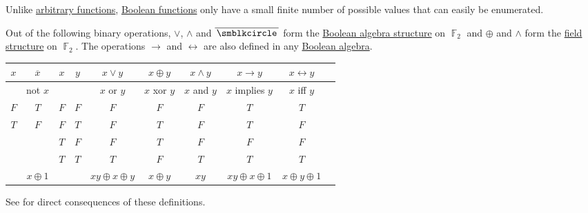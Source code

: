 \begin{definition}\label{def:standard_boolean_operators}
  Unlike \hyperref[def:function/single_valued]{arbitrary functions}, \hyperref[def:boolean_function]{Boolean functions} only have a small finite number of possible values that can easily be enumerated.

  Out of the following binary operations, \( \vee \), \( \wedge \) and \( \overline{\placeholder} \) form the \hyperref[thm:f2_is_boolean_algebra]{Boolean algebra structure} on \( \BbbF_2 \) and \( \oplus \) and \( \wedge \) form the \hyperref[def:field]{field structure} on \( \BbbF_2 \). The operations \( \rightarrow \) and \( \leftrightarrow \) are also defined in any \hyperref[def:boolean_algebra]{Boolean algebra}.

  \begin{center}
    \begin{tabular}{c | c || c c | c c c c c c}
      \( x \) & \( \overline{x} \) & \( x \) & \( y \) & \( x \vee y \) & \( x \oplus y \)    & \( x \wedge y \) & \( x \rightarrow y \)   & \( x \leftrightarrow y \) \\
      \hline
              & not \( x \)        &         &         & \( x \) or \( y \)  & \( x \) xor \( y \) & \( x \) and \( y \)     & \( x \) implies \( y \) & \( x \) iff \( y \)       \\
      \hline
      \( F \) & \( T \)            & \( F \) & \( F \) & \( F \)             & \( F \)             & \( F \)                 & \( T \)                 & \( T \)                   \\
      \( T \) & \( F \)            & \( F \) & \( T \) & \( F \)             & \( T \)             & \( F \)                 & \( T \)                 & \( F \)                   \\
              &                    & \( T \) & \( F \) & \( F \)             & \( T \)             & \( F \)                 & \( F \)                 & \( F \)                   \\
              &                    & \( T \) & \( T \) & \( T \)             & \( F \)             & \( T \)                 & \( T \)                 & \( T \)                   \\
      \hline
              & \( x \oplus 1 \) &         &         & \( xy \oplus x \oplus y \) & \( x \oplus y \)    & \( xy \)            & \( xy \oplus x \oplus 1 \) & \( x \oplus y \oplus 1 \)
    \end{tabular}
  \end{center}

  See  for direct consequences of these definitions.
\end{definition}

